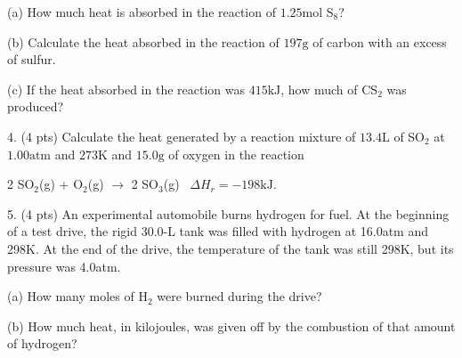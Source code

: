\documentclass[11pt]{article}
\begin{document}
(a) How much heat is absorbed in the reaction of $1.25\text{mol}$ S$_8$?

(b) Calculate the heat absorbed in the reaction of $197\text{g}$ of carbon
with an excess of sulfur.

(c) If the heat absorbed in the reaction was $415\text{kJ}$, how much of CS$_2$
was produced?

\vspace{2in}

4. (4 pts) Calculate the heat generated by a reaction mixture of $13.4\text{L}$ of SO$_2$
at $1.00\text{atm}$ and $273\text{K}$ and $15.0\text{g}$ of oxygen in the reaction

\begin{center}
  2 SO$_2$(g) + O$_2$(g) $\rightarrow$ 2 SO$_3$(g) \, $\Delta H_r = -198\text{kJ}$.
\end{center}

\vspace{1in}

5. (4 pts) An experimental automobile burns hydrogen for fuel. At the beginning of a test
drive, the rigid 30.0-L tank was filled with hydrogen at 16.0atm and 298K. At the end of
the drive, the temperature of the tank was still 298K, but its pressure was 4.0atm.

(a) How many moles of H$_2$ were burned during the drive?

(b) How much heat, in kilojoules, was given off by the combustion of that amount of
hydrogen?


%
%
%
%
%
%
\end{document}
